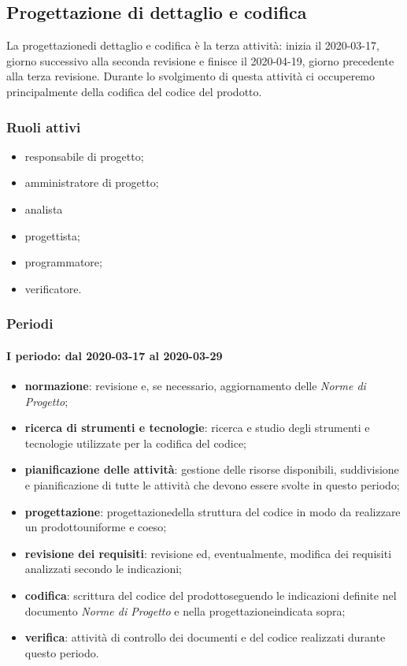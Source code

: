 \subsection{Progettazione di dettaglio e codifica}
La progettazione\glosp di dettaglio e codifica è la terza attività: inizia il 2020-03-17, giorno successivo alla seconda revisione e finisce il 2020-04-19, giorno precedente alla terza revisione. Durante lo svolgimento di questa attività ci occuperemo principalmente della codifica del codice del prodotto\glo.

\subsubsection{Ruoli attivi}
\begin{itemize}
	\item responsabile di progetto\glo;
	\item amministratore di progetto\glo;
	\item analista
	\item progettista;
	\item programmatore;
	\item verificatore.
\end{itemize}

\subsubsection{Periodi}
\paragraph*{I periodo: dal 2020-03-17 al 2020-03-29}
\begin{itemize}
	\item \textbf{normazione}: revisione e, se necessario, aggiornamento delle \textit{Norme di Progetto};
	\item \textbf{ricerca di strumenti e tecnologie}: ricerca e studio degli strumenti e tecnologie utilizzate per la codifica del codice;
	\item \textbf{pianificazione delle attività}: gestione delle risorse disponibili, suddivisione e pianificazione di tutte le attività che devono essere svolte in questo periodo;
	\item \textbf{progettazione}\glo: progettazione\glosp della struttura del codice in modo da realizzare un prodotto\glosp uniforme e coeso;
	\item \textbf{revisione dei requisiti}: revisione ed, eventualmente, modifica dei requisiti analizzati secondo le indicazioni; 
	\item \textbf{codifica}: scrittura del codice del prodotto\glosp seguendo le indicazioni definite nel documento \textit{Norme di Progetto} e nella progettazione\glosp indicata sopra; 
	\item \textbf{verifica}: attività di controllo dei documenti e del codice realizzati durante questo periodo.
\end{itemize}

